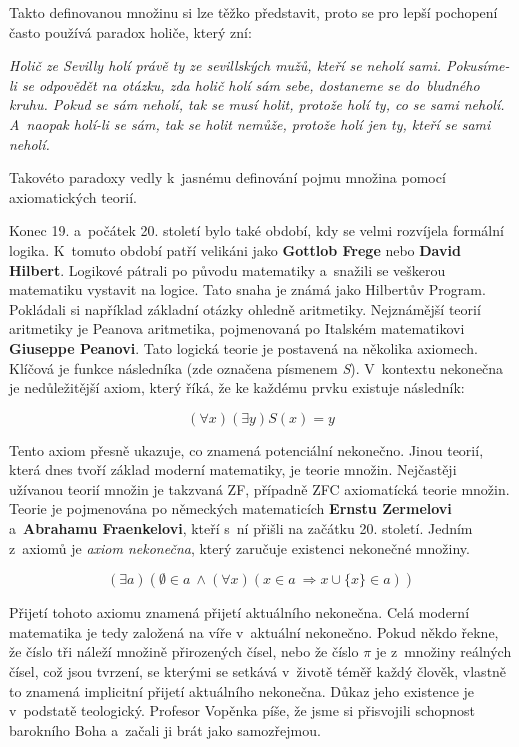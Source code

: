 \documentclass[czech]{article}
\begin{document}
Takto definovanou množinu si lze těžko představit, proto se pro lepší pochopení často používá paradox holiče, který zní:

\begin{flushleft}
\textit{Holič ze Sevilly holí právě ty ze sevillských mužů, kteří se neholí sami. Pokusíme-li se odpovědět na otázku, zda holič holí sám sebe, dostaneme se do~bludného kruhu. Pokud se sám neholí, tak se musí holit, protože holí ty, co se sami neholí. A~naopak holí-li se sám, tak se holit nemůže, protože holí jen ty, kteří se sami neholí.}
\end{flushleft}

Takovéto paradoxy vedly k~jasnému definování pojmu množina pomocí axiomatických teorií.

Konec 19. a~počátek 20. století bylo také období, kdy se velmi rozvíjela formální logika. K~tomuto období patří velikáni jako \textbf{Gottlob Frege} nebo \textbf{David Hilbert}. Logikové pátrali po původu matematiky a~snažili se veškerou matematiku vystavit na logice. Tato snaha je známá jako Hilbertův Program.\cite{hilbert_program} Pokládali si například základní otázky ohledně aritmetiky. Nejznámější teorií aritmetiky je Peanova aritmetika, pojmenovaná po Italském matematikovi \textbf{Giuseppe Peanovi}.\cite{peano}
Tato logická teorie je postavená na několika axiomech. Klíčová je funkce následníka (zde označena písmenem \textit{S}). V~kontextu nekonečna je nedůležitější axiom, který říká, že ke každému prvku existuje následník:

\[
(\forall x) (\exists y ) S(x) = y
\]

Tento axiom přesně ukazuje, co znamená potenciální nekonečno. Jinou teorií, která dnes tvoří základ moderní matematiky, je teorie množin. Nejčastěji užívanou teorií množin je takzvaná ZF, případně ZFC axiomatícká teorie množin. Teorie je pojmenována po německých matematicích \textbf{Ernstu Zermelovi} a~\textbf{Abrahamu Fraenkelovi}, kteří s~ní přišli na začátku 20. století. Jedním z~axiomů je \textit{axiom nekonečna}, který zaručuje existenci nekonečné množiny.

\[
(\exists a)(\emptyset \in a~\land (\forall x)(x \in a~\Longrightarrow x \cup \{ x \} \in a))
\]

Přijetí tohoto axiomu znamená přijetí aktuálního nekonečna.
Celá moderní matematika je tedy založená na víře v~aktuální nekonečno.
Pokud někdo řekne, že číslo tři náleží množině přirozených čísel, nebo že číslo $\pi$ je z~množiny reálných čísel, což jsou tvrzení, se kterými se setkává v~životě téměř každý člověk, vlastně to znamená implicitní přijetí aktuálního nekonečna. Důkaz jeho existence je v~podstatě teologický.
Profesor Vopěnka píše, že jsme si přisvojili schopnost barokního Boha a~začali ji brát jako samozřejmou.\cite{vopenka}
\end{document}
